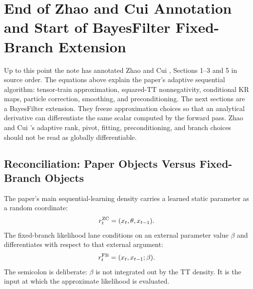 \documentclass[11pt]{article}
\begin{document}
\section{End of Zhao and Cui Annotation and Start of BayesFilter Fixed-Branch Extension}

Up to this point the note has annotated Zhao and Cui \cite{zhao2024ttsequential}, Sections 1--3 and 5 in
source order.  The equations above explain the paper's adaptive sequential
algorithm: tensor-train approximation, squared-TT nonnegativity, conditional KR
maps, particle correction, smoothing, and preconditioning.  The next sections
are a BayesFilter extension.  They freeze approximation choices so that an
analytical derivative can differentiate the same scalar computed by the forward
pass.  Zhao and Cui \cite{zhao2024ttsequential}'s adaptive rank, pivot, fitting, preconditioning, and branch
choices should not be read as globally differentiable.

\subsection*{Reconciliation: Paper Objects Versus Fixed-Branch Objects}

The paper's main sequential-learning density carries a learned static
parameter as a random coordinate:
\[
    r_t^{\rm ZC}=(x_t,\theta,x_{t-1}).
    \label{eq:p24-r1}
\]
The fixed-branch likelihood lane conditions on an external parameter value
\(\beta\) and differentiates with respect to that external argument:
\[
    r_t^{\rm FB}=(x_t,x_{t-1};\beta).
    \label{eq:p24-r2}
\]
The semicolon is deliberate: \(\beta\) is not integrated out by the TT density.
It is the input at which the approximate likelihood is evaluated.
\end{document}
